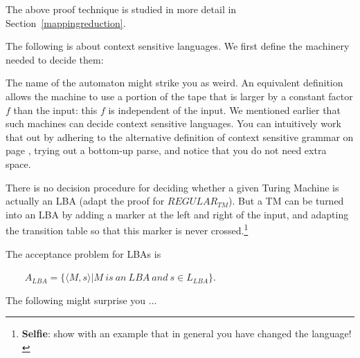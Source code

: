 The above proof technique is studied in more detail in
Section~\ref{mappingreduction}.


The following is about context sensitive languages. We first define
the machinery needed to decide them: 


The name of the automaton might strike you as weird. An equivalent
definition allows the machine to use a portion of the tape that is
larger by a constant factor $f$ than the input: this $f$ is
independent of the input. We mentioned earlier that such machines can
decide context sensitive languages. You can intuitively work that out
by adhering to the alternative definition of context sensitive grammar
on page \pageref{altdefcs}, trying out a bottom-up parse, and notice
that you do not need extra space.

There is no decision procedure for deciding whether a given Turing
Machine is actually an LBA (adapt the proof for $REGULAR_{TM}$). But a
TM can be turned into an LBA by adding a marker at the left and right
of the input, and adapting the transition table so that this marker is
never crossed.\footnote{{\bf Selfie}: show with an example that in
  general you have changed the language!}


The acceptance problem for LBAs is

$~~~~~~~~~A_{LBA} = \{\langle M,s \rangle | M~is~an~LBA~and~s \in L_{LBA}\}$.

The following might surprise you ...


